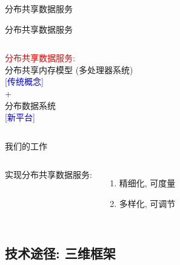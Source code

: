 \begin{frame}{分布共享数据服务}
\end{frame}
\begin{frame}{分布共享数据服务}
  \begin{columns}
	\begin{center}
	  \textcolor{red}{\large 分布共享数据服务:}\\
	  \vspace{0.50cm} 
	  分布共享内存模型 (多处理器系统)\\
	  \textcolor{blue}{[传统概念]}\\
	  \vspace{0.20cm} +\\ \vspace{0.20cm}
	  分布数据系统\\
	  \textcolor{blue}{[新平台]}
	\end{center}
  \end{columns}
\end{frame}
\begin{frame}{我们的工作}
  \begin{columns}
	  实现分布共享数据服务:
	  \begin{enumerate}
		\item 精细化, 可度量
		\item 多样化, 可调节
	  \end{enumerate}
  \end{columns}
\end{frame}
\subsection{技术途径: 三维框架}

